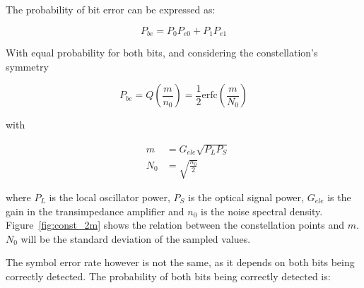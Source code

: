The probability of bit error can be expressed as:

\begin{equation}
P_{be} = P_0 P_{e0} + P_1 P_{e1}
\end{equation}

With equal probability for both bits, and considering the constellation's symmetry

\begin{equation}\label{eq:berMQAM}
P_{be} =  Q\left({\frac{m}{n_0}}\right) = \frac{1}{2} \text{erfc}\left({\frac{m}{N_0}}\right)
\end{equation}





with


\begin{eqnarray}
&m &= G_{ele} \sqrt{P_L P_S} \\
&N_0 &= \sqrt{\frac{n_0}{2}}
\end{eqnarray}

\noindent where $P_L$ is the local oscillator power, $P_S$ is the optical signal power, $G_{ele}$ is the gain in the transimpedance amplifier and $n_0$ is the noise spectral density. Figure~\ref{fig:const_2m} shows the relation between the constellation points and $m$. $N_0$ will be the standard deviation of the sampled values.





The symbol error rate however is not the same, as it depends on both bits being correctly detected. The probability of both bits being correctly detected is:

